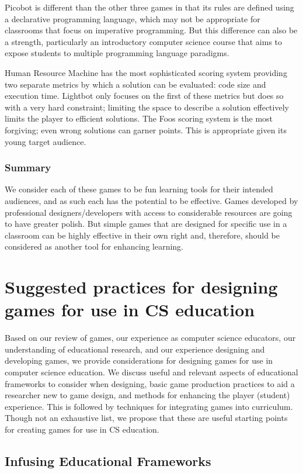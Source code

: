 \documentclass{sig-alternate-05-2015}
\begin{document}
Picobot is different than the other three games in that its rules are defined using a declarative programming language, which may not be appropriate for classrooms that focus on imperative programming. But this difference can also be a strength, particularly an introductory computer science course that aims to expose students to multiple programming language paradigms.



Human Resource Machine has the most sophisticated scoring system providing two separate metrics by which a solution can be evaluated: code size and execution time. Lightbot only focuses on the first of these metrics but does so with a very hard constraint; limiting the space to describe a solution effectively limits the player to efficient solutions. The Foos scoring system is the most forgiving; even wrong solutions can garner points. This is appropriate given its young target audience. \subsubsection{Summary}


We consider each of these games to be fun learning tools for their intended audiences, and as such each has the potential to be effective. Games developed by professional designers/developers with access to considerable resources are going to have greater polish. But simple games that are designed for specific use in a classroom can be highly effective in their own right and, therefore, should be considered as another tool for enhancing learning.\section{Suggested practices for designing games for use in CS education}


Based on our review of games, our experience as computer science educators, our understanding of educational research, and our experience designing and developing games, we provide considerations for designing games for use in computer science education. We discuss useful and relevant aspects of educational frameworks to consider when designing, basic game production practices to aid a researcher new to game design, and methods for enhancing the player (student) experience. This is followed by techniques for integrating games into curriculum. Though not an exhaustive list, we propose that these are useful starting points for creating games for use in CS education. \subsection{Infusing Educational Frameworks}
\end{document}
